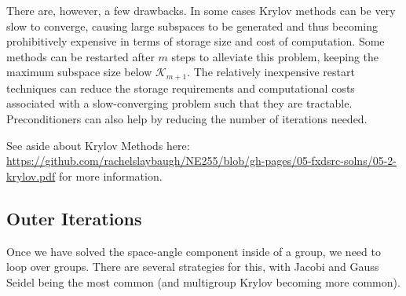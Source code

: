 \documentclass[12pt]{article}
\newcommand{\ve}[1]{\ensuremath{\mathbf{#1}}}
\begin{document}
There are, however, a few drawbacks. In some cases Krylov methods can be very slow to converge, causing large subspaces to be generated and thus becoming prohibitively expensive in terms of storage size and cost of computation. Some methods can be restarted after $m$ steps %
to alleviate this problem, keeping the maximum subspace size below $\mathcal{K}_{m+1}$.  The relatively inexpensive restart techniques can reduce the storage requirements and computational costs associated with a slow-converging problem such that they are tractable. Preconditioners can also help by reducing the number of iterations needed. %


See aside about Krylov Methods here: \href{ https://github.com/rachelslaybaugh/NE255/blob/gh-pages/05-fxdsrc-solns/05-2-krylov.pdf}{ https://github.com/rachelslaybaugh/NE255/blob/gh-pages/05-fxdsrc-solns/05-2-krylov.pdf} for more information.

\subsection*{Outer Iterations}
Once we have solved the space-angle component inside of a group, we need to loop over groups. There are several strategies for this, with Jacobi and Gauss Seidel being the most common (and multigroup Krylov becoming more common).
\end{document}
